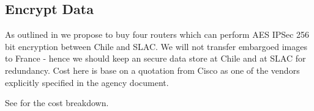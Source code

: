 \subsection{Encrypt Data} \label{sec:1encrypt}

As outlined in   we propose to buy four routers which can perform AES IPSec 256 bit encryption between Chile and SLAC.
We will not transfer embargoed images to France - hence we should keep an secure data store at Chile and at SLAC for redundancy.
Cost here is base on a quotation from Cisco as one of the vendors explicitly specified in the agency document.

See  for the cost breakdown.



